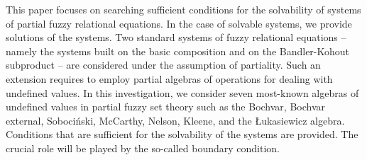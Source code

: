 
This paper focuses on searching sufficient conditions for the solvability of systems of partial fuzzy relational equations. In the case of solvable systems, we provide solutions of the systems. Two standard systems of fuzzy relational equations -- namely the systems built on the basic composition and on the Bandler-Kohout subproduct -- are considered under the assumption of partiality. Such an extension requires to employ partial algebras of operations for dealing with undefined values. In this investigation, we consider seven most-known algebras of undefined values in partial fuzzy set theory such as the Bochvar, Bochvar external, Soboci\'{n}ski, McCarthy, Nelson, Kleene, and the \L{}ukasiewicz algebra. Conditions that are sufficient for the solvability of the systems are provided. The crucial role will be played by the so-called  boundary condition.  


